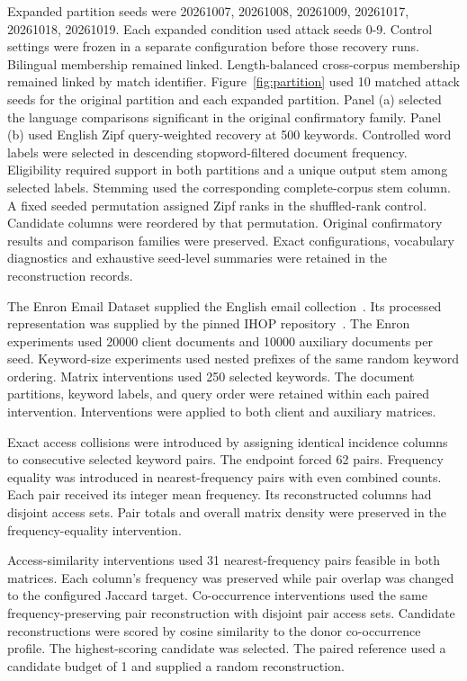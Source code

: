 \documentclass[pdflatex,sn-mathphys-num]{sn-jnl}%
\theoremstyle{thmstyleone}%
\theoremstyle{thmstyletwo}%
\theoremstyle{thmstylethree}%
\newcommand{\Keywords}{500}
\newcommand{\EnronClient}{20000}
\newcommand{\EnronAuxiliary}{10000}
\newcommand{\InterventionKeywords}{250}
\newcommand{\SimilarityPairs}{31}
\newcommand{\CollisionPairs}{62}
\newcommand{\CandidateBudget}{1}
\newcommand{\ExpandedSeeds}{10}
\begin{document}
Expanded partition seeds were 20261007, 20261008, 20261009, 20261017, 20261018, 20261019. Each expanded condition used attack seeds 0-9. Control settings were frozen in a separate configuration before those recovery runs. Bilingual membership remained linked. Length-balanced cross-corpus membership remained linked by match identifier. Figure~\ref{fig:partition} used \ExpandedSeeds{} matched attack seeds for the original partition and each expanded partition. Panel (a) selected the language comparisons significant in the original confirmatory family. Panel (b) used English Zipf query-weighted recovery at \Keywords{} keywords. Controlled word labels were selected in descending stopword-filtered document frequency. Eligibility required support in both partitions and a unique output stem among selected labels. Stemming used the corresponding complete-corpus stem column. A fixed seeded permutation assigned Zipf ranks in the shuffled-rank control. Candidate columns were reordered by that permutation. Original confirmatory results and comparison families were preserved. Exact configurations, vocabulary diagnostics and exhaustive seed-level summaries were retained in the reconstruction records.

The Enron Email Dataset supplied the English email collection~\cite{enrondata}. Its processed representation was supplied by the pinned IHOP repository~\cite{ihopcode}. The Enron experiments used \EnronClient{} client documents and \EnronAuxiliary{} auxiliary documents per seed. Keyword-size experiments used nested prefixes of the same random keyword ordering. Matrix interventions used \InterventionKeywords{} selected keywords. The document partitions, keyword labels, and query order were retained within each paired intervention. Interventions were applied to both client and auxiliary matrices.

Exact access collisions were introduced by assigning identical incidence columns to consecutive selected keyword pairs. The endpoint forced \CollisionPairs{} pairs. Frequency equality was introduced in nearest-frequency pairs with even combined counts. Each pair received its integer mean frequency. Its reconstructed columns had disjoint access sets. Pair totals and overall matrix density were preserved in the frequency-equality intervention.

Access-similarity interventions used \SimilarityPairs{} nearest-frequency pairs feasible in both matrices. Each column's frequency was preserved while pair overlap was changed to the configured Jaccard target. Co-occurrence interventions used the same frequency-preserving pair reconstruction with disjoint pair access sets. Candidate reconstructions were scored by cosine similarity to the donor co-occurrence profile. The highest-scoring candidate was selected. The paired reference used a candidate budget of \CandidateBudget{} and supplied a random reconstruction.
\end{document}
